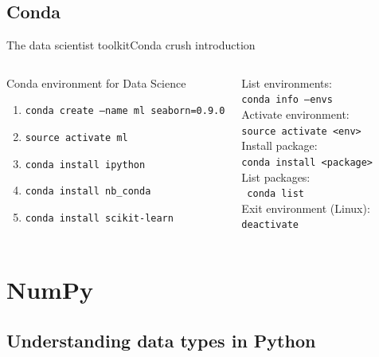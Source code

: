 \documentclass[10pt,compress]{beamer} %
\begin{document}
\subsection{Conda}
\begin{frame}{The data scientist toolkit}{Conda crush introduction}
    \begin{columns}
	   \begin{block}{Conda environment for Data Science}
	   	\begin{enumerate}
			\item \texttt{conda create --name ml seaborn=0.9.0}
			\item \texttt{source activate ml}
			\item \texttt{conda install ipython}
			\item \texttt{conda install nb\_conda}
			\item \texttt{conda install scikit-learn}
		\end{enumerate}
	   \end{block}

		List environments: \\ \quad \texttt{conda info --envs}\\
		Activate environment: \\ \quad \texttt{source activate <env>}\\
		Install package: \\ \quad \texttt{conda install <package>}\\
		List packages: \\ \quad \texttt{conda list}\\
		Exit environment (Linux): \\ \quad \indent \texttt{deactivate}
	\end{columns}
\end{frame}

\section{NumPy}

\subsection{Understanding data types in Python}
\end{document}
